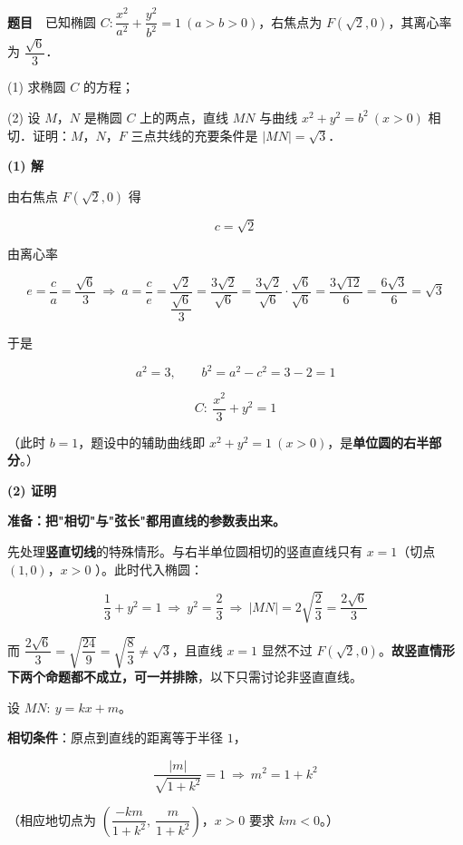 \par\medskip


\textbf{题目}　已知椭圆 $C:\dfrac{x^{2}}{a^{2}}+\dfrac{y^{2}}{b^{2}}=1\ (a>b>0)$，右焦点为 $F\left(\sqrt2,0\right)$，其离心率为 $\dfrac{\sqrt6}3$．

  (1) 求椭圆 $C$ 的方程；

  (2) 设 $M$，$N$ 是椭圆 $C$ 上的两点，直线 $MN$ 与曲线 $x^{2}+y^{2}=b^{2}\ (x>0)$ 相切．证明：$M$，$N$，$F$ 三点共线的充要条件是 $|MN|=\sqrt3$．

\par\medskip

\textbf{(1) 解}

由右焦点 $F\left(\sqrt2,0\right)$ 得

\[c=\sqrt2\]

由离心率

\[e=\frac ca=\frac{\sqrt6}3\ \Longrightarrow\ a=\frac c e=\frac{\sqrt2}{\dfrac{\sqrt6}3}=\frac{3\sqrt2}{\sqrt6}=\frac{3\sqrt2}{\sqrt6}\cdot\frac{\sqrt6}{\sqrt6}=\frac{3\sqrt{12}}6=\frac{6\sqrt3}6=\sqrt3\]

于是

\[a^{2}=3,\qquad b^{2}=a^{2}-c^{2}=3-2=1\]

\[C:\ \frac{x^{2}}3+y^{2}=1\]

（此时 $b=1$，题设中的辅助曲线即 $x^{2}+y^{2}=1\ (x>0)$，是\textbf{单位圆的右半部分}。）

\par\medskip

\textbf{(2) 证明}

\textbf{准备：把"相切"与"弦长"都用直线的参数表出来。}

先处理\textbf{竖直切线}的特殊情形。与右半单位圆相切的竖直直线只有 $x=1$（切点 $(1,0)$，$x>0$ ）。此时代入椭圆：

\[\frac13+y^{2}=1\ \Longrightarrow\ y^{2}=\frac23\ \Longrightarrow\ |MN|=2\sqrt{\frac23}=\frac{2\sqrt6}3\]

而 $\dfrac{2\sqrt6}3=\sqrt{\dfrac{24}9}=\sqrt{\dfrac83}\ne\sqrt3$，且直线 $x=1$ 显然不过 $F\left(\sqrt2,0\right)$。\textbf{故竖直情形下两个命题都不成立，可一并排除}，以下只需讨论非竖直直线。

设 $MN:\ y=kx+m$。

\textbf{相切条件}：原点到直线的距离等于半径 $1$，

\[\frac{|m|}{\sqrt{1+k^{2}}}=1\ \Longrightarrow\ m^{2}=1+k^{2}\tag{$\ast$}\]

（相应地切点为 $\left(\dfrac{-km}{1+k^{2}},\ \dfrac m{1+k^{2}}\right)$，$x>0$ 要求 $km<0$。）

